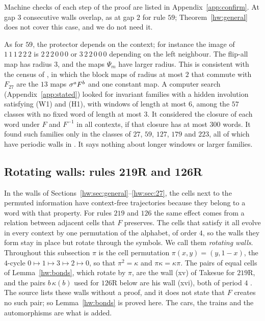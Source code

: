 Machine checks of each step of the proof are listed in Appendix~\ref{app:confirm}. At gap $3$ consecutive walls overlap, as at gap $2$ for rule $59$; Theorem~\ref{hw:general} does not cover this case, and we do not need it.

As for $59$, the protector depends on the context; for instance the image of $1\,1\,1\,2\,2\,2$ is $2\,2\,2\,0\,0\,0$ or $3\,2\,2\,0\,0\,0$ depending on the left neighbour. The flip-all map has radius $3$, and the maps $\Psi_m$ have larger radius. This is consistent with the census of \cite{PaperD}, in which the block maps of radius at most $2$ that commute with $F_{27}$ are the $13$ maps $\sigma^aF^b$ and one constant map. A computer search (Appendix~\ref{app:stated}) looked for invariant families with a hidden involution satisfying (W1) and (H1), with windows of length at most $6$, among the $57$ classes with no fixed word of length at most $3$. It considered the closure of each word under $F$ and $F^{-1}$ in all contexts, if that closure has at most $300$ words. It found such families only in the classes of $27$, $59$, $127$, $179$ and $223$, all of which have periodic walls in \cite[Section~4]{Takesue1989}. It says nothing about longer windows or larger families.

\subsection{Rotating walls: rules 219R and 126R}\label{hw:sec:moving}

In the walls of Sections~\ref{hw:sec:general}--\ref{hw:sec:27}, the cells next to the permuted information have context-free trajectories because they belong to a word with that property. For rules $219$ and $126$ the same effect comes from a relation between adjacent cells that $F$ preserves. The cells that satisfy it all evolve in every context by one permutation of the alphabet, of order $4$, so the walls they form stay in place but rotate through the symbols. We call them \emph{rotating walls}. Throughout this subsection $\pi$ is the cell permutation $\pi(x,y)=(y,1-x)$, the $4$-cycle $0\mapsto1\mapsto3\mapsto2\mapsto0$, so that $\pi^2=\kappa$ and $\pi\kappa=\kappa\pi$. The pairs of equal cells of Lemma~\ref{hw:bonds}, which rotate by $\pi$, are the wall (xv) of Takesue for $219$R, and the pairs $b\,\kappa(b)$ used for $126$R below are his wall (xvi), both of period $4$ \cite[Fig.~2, Table~III]{Takesue1989}. The source lists these walls without a proof, and it does not state that $F$ creates no such pair; so Lemma~\ref{hw:bonds} is proved here. The cars, the trains and the automorphisms are what is added.

